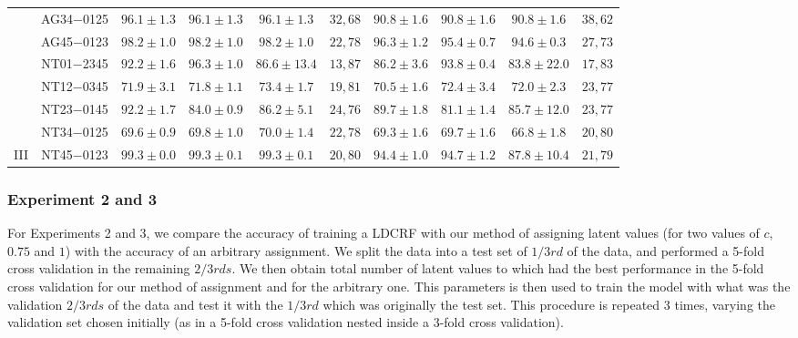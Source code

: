 \documentclass[10pt, conference]{IEEEtran}
\begin{document}
\begin{table*}[!ht]
{\begin{tabular}{c|ccccc|cccc}
 & \multicolumn{1}{c|}{AG34$-$0125}  & $96.1  \pm  1.3$ & $96.1  \pm  1.3$ & $96.1  \pm  1.3$ & $32,68$ & $90.8  \pm  1.6$ & $90.8  \pm  1.6$ & $90.8  \pm  1.6$ & $38,62$\\
 & \multicolumn{1}{c|}{AG45$-$0123}  & $98.2  \pm  1.0$ & $98.2  \pm  1.0$ & $98.2  \pm  1.0$ & $22,78$ & $\mathbf{96.3  \pm  1.2}$ & $95.4  \pm  0.7$ & $94.6  \pm  0.3$ & $27,73$ \\
 & \multicolumn{1}{c|}{NT01$-$2345}  & $92.2  \pm  1.6$ & $\mathbf{96.3  \pm  1.0}$ & $86.6  \pm  13.4$ & $13,87$ & $86.2  \pm  3.6$ & $\mathbf{93.8  \pm  0.4}$ & $83.8  \pm  22.0$ & $17,83$ \\
 & \multicolumn{1}{c|}{NT12$-$0345}  & $71.9  \pm  3.1$ & $71.8  \pm  1.1$ & $\mathbf{73.4  \pm  1.7}$ & $19,81$ & $70.5  \pm  1.6$ & $72.4  \pm  3.4$ & $72.0  \pm  2.3$ & $23,77$\\
 & \multicolumn{1}{c|}{NT23$-$0145}  & $\mathbf{92.2  \pm  1.7}$ & $84.0  \pm  0.9$ & $86.2  \pm  5.1$ & $24,76$ & $\mathbf{89.7  \pm  1.8}$ & $81.1  \pm  1.4$ & $85.7  \pm  12.0$ & $23,77$ \\
 & \multicolumn{1}{c|}{NT34$-$0125}  & $69.6  \pm  0.9$ & $69.8  \pm  1.0$ & $70.0  \pm  1.4$ & $22,78$ & $69.3  \pm  1.6$ & $\mathbf{69.7  \pm  1.6}$ & $66.8  \pm  1.8$ & $20,80$ \\
\multirow{-10}{*}{III}  & \multicolumn{1}{c|}{NT45$-$0123}  & $99.3  \pm  0.0$ & $99.3  \pm  0.1$ & $99.3  \pm  0.1$ & $20,80$ & $94.4  \pm  1.0$ & $\mathbf{94.7  \pm  1.2}$ & $87.8  \pm  10.4$ & $21,79$ \\
\hline
\end{tabular}}
\label{t1}

\end{table*}







\subsubsection{Experiment 2 and 3}

For Experiments 2 and 3, we compare the accuracy of training a LDCRF with our method of assigning latent values (for two values of $c$, $0.75$ and $1$) with the accuracy of an arbitrary assignment. 
We split the data into a test set of $1/3rd$ of the data, and performed a 5-fold cross validation in the remaining $2/3rds$. 
We then obtain total number of latent values to which had the best performance in the 5-fold cross validation for our method of assignment and for the arbitrary one. This parameters is then used to train the model with what was the validation $2/3rds$ of the data and test it with the $1/3rd$ which was originally the test set. This procedure is repeated $3$ times, varying the validation set chosen initially (as in a 5-fold cross validation nested inside a 3-fold cross validation).
\end{document}
